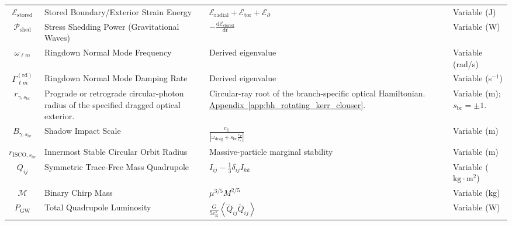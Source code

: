 \begin{longtable}{@{} c p{5.5cm} p{4cm} p{3.5cm} @{}}
$\mathcal{E}_{\mathrm{stored}}$ & Stored Boundary/Exterior Strain Energy & $\mathcal{E}_{\mathrm{radial}} + \mathcal{E}_{\mathrm{tor}} + \mathcal{E}_{\partial}$ & Variable (J) \\

$\mathcal{P}_{\mathrm{shed}}$ & Stress Shedding Power (Gravitational Waves) & $-\frac{\mathrm{d}\mathcal{E}_{\mathrm{stored}}}{\mathrm{d}t}$ & Variable (W) \\

$\omega_{\ell m}$ & Ringdown Normal Mode Frequency & Derived eigenvalue & Variable (rad/s) \\

$\Gamma_{\ell m}^{(\mathrm{rd})}$ & Ringdown Normal Mode Damping Rate & Derived eigenvalue & Variable (s$^{-1}$) \\

$r_{\gamma,s_{\mathrm{br}}}$ & {\raggedright Prograde or retrograde circular-photon radius of the specified dragged optical exterior.\par} & {\raggedright Circular-ray root of the branch-specific optical Hamiltonian. \newline \hyperref[app:bh_rotating_kerr_clouser]{Appendix~\ref*{app:bh_rotating_kerr_clouser}}.\par} & {\raggedright Variable ($\mathrm m$); $s_{\mathrm{br}}=\pm1$.\par} \\

$B_{\gamma,s_{\mathrm{br}}}$ & Shadow Impact Scale & $\frac{c_{\mathrm{E}}}{\left| \omega_{\mathrm{drag}} + s_{\mathrm{br}} \frac{c_P}{r_\gamma} \right|}$ & Variable (m) \\

$r_{\mathrm{ISCO},s_{\mathrm{br}}}$ & Innermost Stable Circular Orbit Radius & Massive-particle marginal stability & Variable (m) \\

$Q_{ij}$ & Symmetric Trace-Free Mass Quadrupole & $I_{ij} - \frac{1}{3}\delta_{ij}I_{kk}$ & Variable ($\text{kg}\cdot\text{m}^2$) \\

$\mathcal{M}$ & Binary Chirp Mass & $\mu^{3/5}M^{2/5}$ & Variable (kg) \\

$P_{\mathrm{GW}}$ & Total Quadrupole Luminosity & $\frac{G}{5c_{\mathrm{E}}^5} \left\langle \dddot{Q}_{ij} \dddot{Q}_{ij} \right\rangle$ & Variable (W) \\

\bottomrule
\end{longtable}

